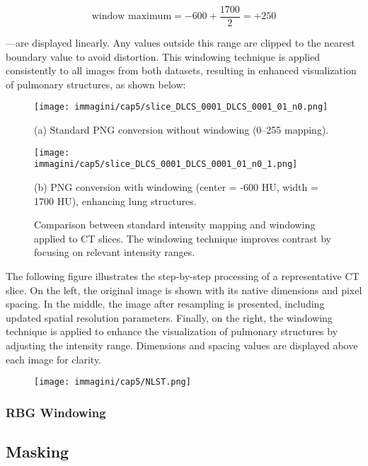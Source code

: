 \begin{equation*}
    \text{window maximum} = -600 + \dfrac{1700}{2} = + 250
\end{equation*}

—are displayed linearly. Any values outside this range are clipped to the nearest boundary value to avoid distortion.
This windowing technique is applied consistently to all images from both datasets, resulting in enhanced visualization of pulmonary structures, as shown below:

\begin{figure}[htbp]
    \centering
    \begin{minipage}{0.44\textwidth}
        \centering
        \texttt{[image: immagini/cap5/slice\_DLCS\_0001\_DLCS\_0001\_01\_n0.png]}
        \caption*{(a) Standard PNG conversion without windowing (0--255 mapping).}
    \end{minipage}\hfill
    \begin{minipage}{0.44\textwidth}
        \centering
        \texttt{[image: immagini/cap5/slice\_DLCS\_0001\_DLCS\_0001\_01\_n0\_1.png]}
        \caption*{(b) PNG conversion with windowing (center = -600 HU, width = 1700 HU), enhancing lung structures.}
    \end{minipage}
    \caption{Comparison between standard intensity mapping and windowing applied to CT slices. The windowing technique improves contrast by focusing on relevant intensity ranges.}
    \label{fig:windowing_comparison}
\end{figure}

The following figure illustrates the step-by-step processing of a representative CT slice. On the left, the original image is shown with its native dimensions and pixel spacing. In the middle, the image after resampling is presented, including updated spatial resolution parameters. Finally, on the right, the windowing technique is applied to enhance the visualization of pulmonary structures by adjusting the intensity range. Dimensions and spacing values are displayed above each image for clarity.
\begin{figure}
    \centering
    \texttt{[image: immagini/cap5/NLST.png]}
    \caption{}
    \label{fig:final_preprocess}
\end{figure}

\subsubsection{RBG Windowing}
\subsection{Masking}